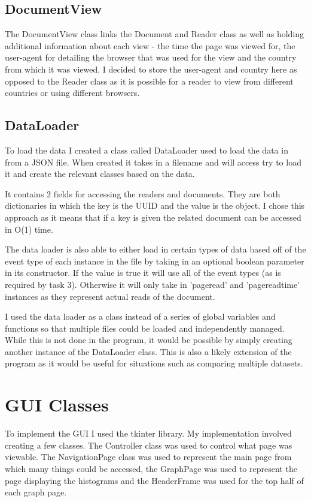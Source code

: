 \documentclass[11pt]{report}
\begin{document}
\subsection{DocumentView}
The DocumentView class links the Document and Reader class as well as holding additional information about each view - the time the page was viewed for, the user-agent for detailing the browser that was used for the view and the country from which it was viewed.  I decided to store the user-agent and country here as opposed to the Reader class as it is possible for a reader to view from different countries or using different browsers.

\subsection{DataLoader}
To load the data I created a class called DataLoader used to load the data in from a JSON file.  When created it takes in a filename and will access try to load it and create the relevant classes based on the data.  

It contains 2 fields for accessing the readers and documents.  They are both dictionaries in which the key is the UUID and the value is the object.  I chose this approach as it means that if a key is given the related document can be accessed in O(1) time.

The data loader is also able to either load in certain types of data based off of the event type of each instance in the file by taking in an optional boolean parameter in its constructor.  If the value is true it will use all of the event types (as is required by task 3).  Otherwise it will only take in 'pageread' and 'pagereadtime' instances as they represent actual reads of the document.

I used the data loader as a class instead of a series of global variables and functions so that multiple files could be loaded and independently managed.  While this is not done in the program, it would be possible by simply creating another instance of the DataLoader class.  This is also a likely extension of the program as it would be useful for situations such as comparing multiple datasets.

\section{GUI Classes}
To implement the GUI I used the tkinter library.  My implementation involved creating a few classes.  The Controller class was used to control what page was viewable.  The NavigationPage class was used to represent the main page from which many things could be accessed, the GraphPage was used to represent the page displaying the histograms and the HeaderFrame was used for the top half of each graph page.
\end{document}
